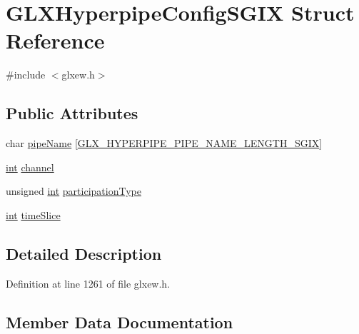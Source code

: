 \hypertarget{struct_g_l_x_hyperpipe_config_s_g_i_x}{}\section{G\+L\+X\+Hyperpipe\+Config\+S\+G\+I\+X Struct Reference}
\label{struct_g_l_x_hyperpipe_config_s_g_i_x}


{\ttfamily \#include $<$glxew.\+h$>$}

\subsection*{Public Attributes}
\begin{DoxyCompactItemize}
\item 
char \hyperlink{struct_g_l_x_hyperpipe_config_s_g_i_x_a9e3748f92005cac81cb44d4c67acccb8}{pipe\+Name} \mbox{[}\hyperlink{glxew_8h_ae1c8261c0861010d8003a31d07e26005}{G\+L\+X\+\_\+\+H\+Y\+P\+E\+R\+P\+I\+P\+E\+\_\+\+P\+I\+P\+E\+\_\+\+N\+A\+M\+E\+\_\+\+L\+E\+N\+G\+T\+H\+\_\+\+S\+G\+I\+X}\mbox{]}
\item 
\hyperlink{wglew_8h_a500a82aecba06f4550f6849b8099ca21}{int} \hyperlink{struct_g_l_x_hyperpipe_config_s_g_i_x_abc812d8796ba89d5de4e33b3532d8335}{channel}
\item 
unsigned \hyperlink{wglew_8h_a500a82aecba06f4550f6849b8099ca21}{int} \hyperlink{struct_g_l_x_hyperpipe_config_s_g_i_x_a093cfaaec305531f66e1120929b5b01b}{participation\+Type}
\item 
\hyperlink{wglew_8h_a500a82aecba06f4550f6849b8099ca21}{int} \hyperlink{struct_g_l_x_hyperpipe_config_s_g_i_x_afe9288e75dc1ae5e0f33eff978d7024d}{time\+Slice}
\end{DoxyCompactItemize}


\subsection{Detailed Description}


Definition at line 1261 of file glxew.\+h.



\subsection{Member Data Documentation}
\hypertarget{struct_g_l_x_hyperpipe_config_s_g_i_x_abc812d8796ba89d5de4e33b3532d8335}{}
